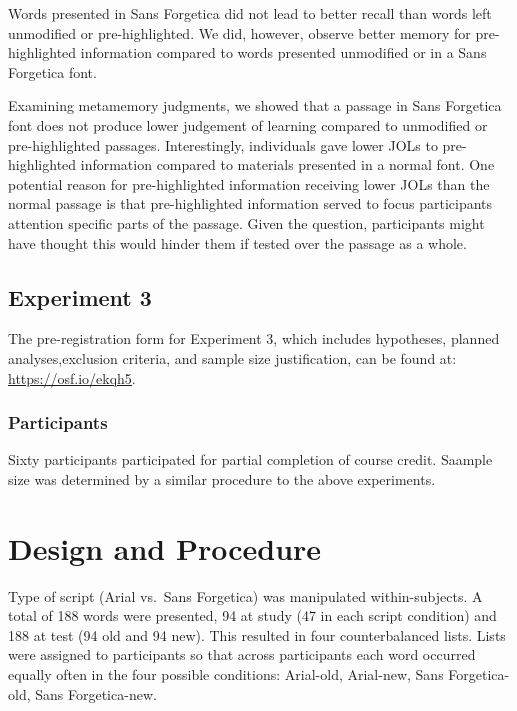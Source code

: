 \documentclass[english,pdf]{apa6}
\begin{document}
Words presented in Sans Forgetica did not lead to better recall than words left unmodified or pre-highlighted. We did, however, observe better memory for pre-highlighted information compared to words presented unmodified or in a Sans Forgetica font.

Examining metamemory judgments, we showed that a passage in Sans Forgetica font does not produce lower judgement of learning compared to unmodified or pre-highlighted passages. Interestingly, individuals gave lower JOLs to pre-highlighted information compared to materials presented in a normal font. One potential reason for pre-highlighted information receiving lower JOLs than the normal passage is that pre-highlighted information served to focus participants attention specific parts of the passage. Given the question, participants might have thought this would hinder them if tested over the passage as a whole.

\hypertarget{experiment-3}{%
\subsection{Experiment 3}\label{experiment-3}}

The pre-registration form for Experiment 3, which includes hypotheses, planned analyses,exclusion criteria, and sample size justification, can be found at: \url{https://osf.io/ekqh5}.

\hypertarget{participants-2}{%
\subsubsection{Participants}\label{participants-2}}

Sixty participants participated for partial completion of course credit. Saample size was determined by a similar procedure to the above experiments.

\hypertarget{design-and-procedure-2}{%
\section{Design and Procedure}\label{design-and-procedure-2}}

Type of script (Arial vs.~Sans Forgetica) was manipulated within-subjects. A total of 188 words were presented, 94 at study (47 in
each script condition) and 188 at test (94 old and 94 new). This resulted in four counterbalanced lists. Lists were assigned
to participants so that across participants each word occurred equally often in the four possible conditions: Arial-old, Arial-new, Sans Forgetica-old, Sans Forgetica-new.
\end{document}
